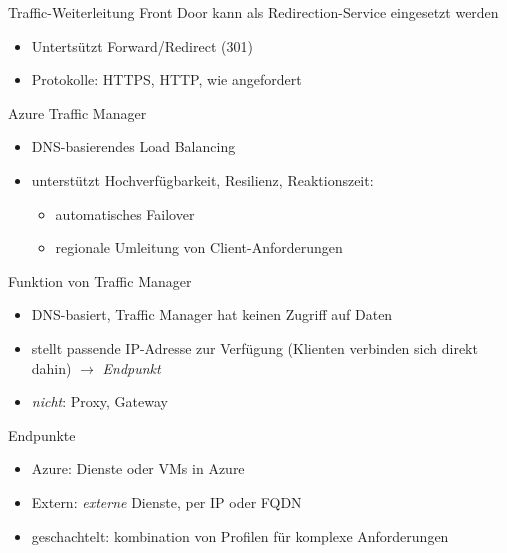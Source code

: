 \begin{flashcard}[Definition]{Traffic-Weiterleitung}
    Front Door kann als Redirection-Service eingesetzt werden
    \begin{itemize}
        \item Untertsützt Forward/Redirect (301)
        \item Protokolle: HTTPS, HTTP, wie angefordert
    \end{itemize}
\end{flashcard}


\begin{flashcard}[Definition]{Azure Traffic Manager}
    \begin{itemize}
        \item DNS-basierendes Load Balancing
        \item unterstützt Hochverfügbarkeit, Resilienz, Reaktionszeit:
            \begin{itemize}
                \item automatisches Failover
                \item regionale Umleitung von Client-Anforderungen
            \end{itemize}
    \end{itemize}
\end{flashcard}

\begin{flashcard}[Definition]{Funktion von Traffic Manager}
    \begin{itemize}
        \item DNS-basiert, Traffic Manager hat keinen Zugriff auf Daten
        \item stellt passende IP-Adresse zur Verfügung (Klienten verbinden sich direkt dahin)\newline
            $\rightarrow$ \emph{Endpunkt}
        \item \emph{nicht}: Proxy, Gateway
    \end{itemize}
    \vspace{1cm}
    Endpunkte
    \begin{itemize}
        \item Azure: Dienste oder VMs in Azure
        \item Extern: \emph{externe} Dienste, per IP oder FQDN
        \item geschachtelt: kombination von Profilen für komplexe Anforderungen
    \end{itemize}
\end{flashcard}

